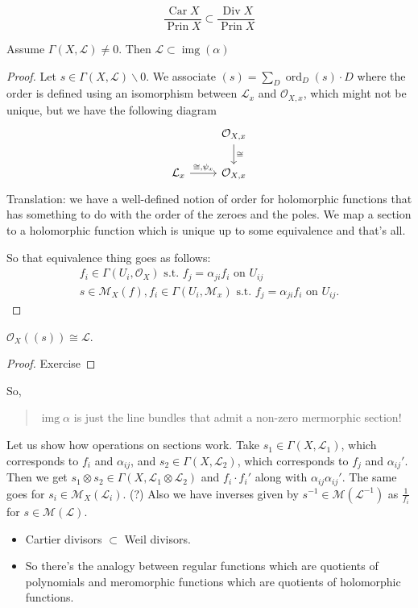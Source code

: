 \documentclass{article}
\newcommand{\Lc}{\mathcal{L}}
\newcommand{\Mc}{\mathcal{M}}
\newcommand{\Oc}{\mathcal{O}}
\DeclareMathOperator{\img}{img}
\DeclareMathOperator{\Car}{Car}
\DeclareMathOperator{\Prin}{Prin}
\DeclareMathOperator{\Div}{Div}
\DeclareMathOperator{\ord}{ord}
\begin{document}
\[\dfrac{\Car X}{\Prin X}\subset\dfrac{\Div X}{\Prin X}\]
\begin{claim}
	Assume $\Gamma(X,\Lc)\neq0$. Then $\Lc\subset\img(\alpha)$
\end{claim}
\begin{proof}
	Let $s\in\Gamma(X,\Lc)\backslash0$. We associate $(s)=\sum_D\ord_D(s)\cdot D$ where the order is defined using an isomorphism between $\Lc_x$ and $\Oc_{X,x}$, which might not be unique, but we have the following diagram
	\[\begin{tikzcd}
		&\Oc_{X,x}\arrow[d,"\cong"]\\
		\Lc_x\arrow[r,"\cong\text{,}\psi_x"]&\Oc_{X,x}
	\end{tikzcd}\]
	Translation: we have a well-defined notion of order for holomorphic functions that has something to do with the order of the zeroes and the poles. We map a section to a holomorphic function which is unique up to some equivalence and that's all.
	
	So that equivalence thing goes as follows:
	\begin{align*}
		f_i\in\Gamma(U_i,\Oc_X) \text{ s.t. } f_j=\alpha_{ji}f_i\text{ on }U_{ij}\\
		s\in\Mc_X(f),f_i\in\Gamma(U_i,\Mc_x)\text{ s.t. }f_j=\alpha_{ji}f_i\text{ on }U_{ij}.
	\end{align*}
\end{proof}
\begin{claim}
	$\Oc_X((s))\cong\Lc$.
\end{claim}
\begin{proof}
	Exercise
\end{proof}
So,
\begin{quote}
	{\color{red}$\img\alpha$ is just the line bundles that admit a non-zero mermorphic section!}
\end{quote}
Let us show how operations on sections work. Take $s_1\in\Gamma(X,\Lc_1)$, which corresponds to $f_i$ and $\alpha_{ij}$, and $s_2\in\Gamma(X,\Lc_2)$, which corresponds to $f_j$ and $\alpha_{ij}'$. Then we get $s_1\otimes s_2\in\Gamma(X,\Lc_1\otimes\Lc_2)$ and $f_i\cdot f_i'$ along with $\alpha_{ij}\alpha_{ij}'$. {\color{magenta}The same goes for $s_i\in\Mc_X(\Lc_i)$. (?)} Also we have inverses given by $s^{-1}\in\Mc(\Lc^{-1})$ as $\frac{1}{f_i}$ for $s\in\Mc(\Lc)$.
\begin{remark}\leavevmode
	\begin{itemize}
		\item Cartier divisors $\subset$ Weil divisors.
		\item So there's the analogy between regular functions which are quotients of polynomials and meromorphic functions which are quotients of holomorphic functions.
	\end{itemize}
\end{remark}
\end{document}
